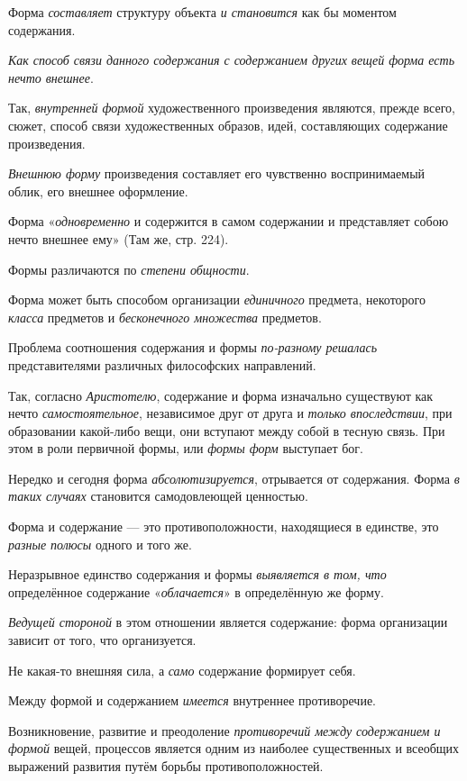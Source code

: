 \documentclass[a4paper,14pt,russian]{extreport}
\begin{document}
Форма \emph{составляет} структуру объекта \emph{и становится} как бы моментом содержания.

\emph{Как способ связи данного содержания с содержанием других вещей форма есть нечто внешнее}.

Так, \emph{внутренней формой} художественного произведения являются, прежде всего, сюжет, способ связи художественных образов, идей, составляющих содержание произведения.

\emph{Внешнюю форму} произведения составляет его чувственно воспринимаемый облик, его внешнее оформление.

Форма «\emph{одновременно} и содержится в самом содержании и представляет собою нечто внешнее ему» (Там же, стр. 224).

Формы различаются по \emph{степени общности}.

Форма может быть способом организации \emph{единичного} предмета, некоторого \emph{класса} предметов и \emph{бесконечного множества} предметов.

Проблема соотношения содержания и формы \emph{по-разному решалась} представителями различных философских направлений.

Так, согласно \emph{Аристотелю}, содержание и форма изначально существуют как нечто \emph{самостоятельное}, независимое друг от друга и \emph{только впоследствии}, при образовании какой-либо вещи, они вступают между собой в тесную связь. При этом в роли первичной формы, или \emph{формы форм} выступает бог.

Нередко и сегодня форма \emph{абсолютизируется}, отрывается от содержания. Форма \emph{в таких случаях} становится самодовлеющей ценностью.

Форма и содержание --- это противоположности, находящиеся в единстве, это \emph{разные полюсы} одного и того же.

Неразрывное единство содержания и формы \emph{выявляется в том, что} определённое содержание «\emph{облачается}» в определённую же форму.

\emph{Ведущей стороной} в этом отношении является содержание: форма организации зависит от того, что организуется.

Не какая-то внешняя сила, а \emph{само} содержание формирует себя.

Между формой и содержанием \emph{имеется} внутреннее противоречие.

Возникновение, развитие и преодоление \emph{противоречий между содержанием и формой} вещей, процессов является одним из наиболее существенных и всеобщих выражений развития путём борьбы противоположностей.
\end{document}
